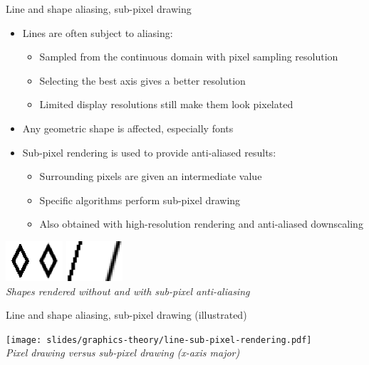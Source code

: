 \begin{frame}{Line and shape aliasing, sub-pixel drawing}
  \begin{itemize}
  \item Lines are often subject to aliasing:
    \begin{itemize}
    \item Sampled from the continuous domain with pixel sampling resolution
    \item Selecting the best axis gives a better resolution
    \item Limited display resolutions still make them look pixelated
    \end{itemize}
  \item Any geometric shape is affected, especially fonts
  \item Sub-pixel rendering is used to provide anti-aliased results:
    \begin{itemize}
    \item Surrounding pixels are given an intermediate value
    \item Specific algorithms perform sub-pixel drawing
    \item Also obtained with high-resolution rendering and anti-aliased downscaling
    \end{itemize}
  \end{itemize}

  \begin{center}
  \includegraphics[height=4em]{slides/graphics-theory/diamond-sub-pixel.png}
  \includegraphics[height=4em]{slides/graphics-theory/line-sub-pixel.png}\\
  \textit{\small Shapes rendered without and with sub-pixel anti-aliasing}
  \end{center}
\end{frame}

\begin{frame}{Line and shape aliasing, sub-pixel drawing (illustrated)}
  \begin{center}
  \texttt{[image: slides/graphics-theory/line-sub-pixel-rendering.pdf]}\\
  \textit{\small Pixel drawing versus sub-pixel drawing (x-axis major)}
  \end{center}
\end{frame}

